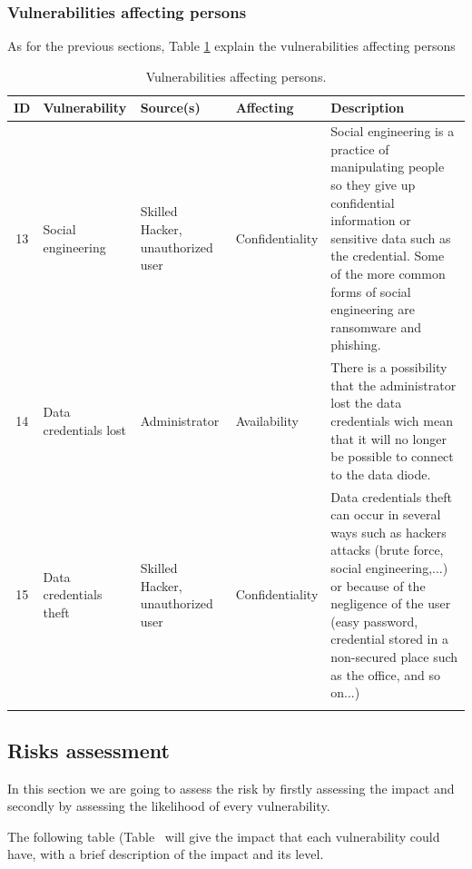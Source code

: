 \documentclass[a4paper,10pt]{article}
\begin{document}
\subsubsection{Vulnerabilities affecting persons}
As for the previous sections, Table \ref{tab:person-assets} explain the vulnerabilities affecting persons
\begin{longtable}{|c|p{2.5cm}|p{2.5cm}|p{2.5cm}|p{6.5cm}|}
\hline
\textbf{ID}&  \textbf{Vulnerability} & \textbf{Source(s)} & \textbf{Affecting} & \textbf{Description} \\
\hline
13 & Social engineering & Skilled Hacker, unauthorized user & Confidentiality & Social engineering is a practice of manipulating people so they give up confidential information or sensitive data such as the credential. Some of the more common forms of social engineering are ransomware and phishing. \\
\hline
14 & Data credentials lost & Administrator & Availability  & There is a possibility that the administrator lost the data credentials wich mean that it will no longer be possible to connect to the data diode. \\
\hline
15 & Data credentials theft &  Skilled Hacker, unauthorized user & Confidentiality & Data credentials theft can occur in several ways such as hackers attacks (brute force, social engineering,...)  or because of the negligence of the user (easy password, credential stored in a non-secured place such as the office, and so on...)  \\
\hline
\caption{Vulnerabilities affecting persons.}
\label{tab:person-assets}
\end{longtable}

\subsection{Risks assessment}
In this section we are going to assess the risk by firstly assessing the impact and secondly by assessing the likelihood of every vulnerability. 

The following table (Table \ will give the impact that each vulnerability could have, with a brief description of the impact and its level.
\end{document}

